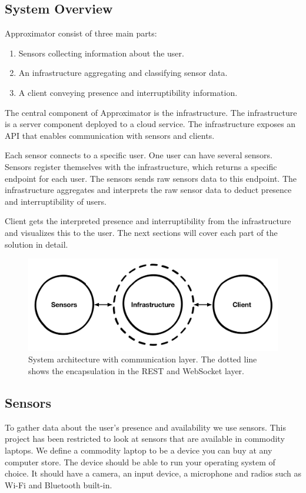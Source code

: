 \documentclass{sigchi}
\begin{document}
\subsection{System Overview}
Approximator consist of three main parts:
\begin{enumerate}[noitemsep]
  \item Sensors collecting information about the user.
  \item An infrastructure aggregating and classifying sensor data.
  \item A client conveying presence and interruptibility information.
\end{enumerate}

The central component of Approximator is the infrastructure.
The infrastructure is a server component deployed to a cloud service.
The infrastructure exposes an API that enables communication with sensors and clients.

Each sensor connects to a specific user.
One user can have several sensors.
Sensors register themselves with the infrastructure, which returns a specific endpoint for each user.
The sensors sends raw sensors data to this endpoint.
The infrastructure aggregates and interprets the raw sensor data to deduct presence and interruptibility of users.

Client gets the interpreted presence and interruptibility from the infrastructure and visualizes this to the user.
The next sections will cover each part of the solution in detail.

\begin{figure}[H]
  \centering
  \includegraphics[width=\columnwidth]{figures/system_architecture.pdf}
  \caption{System architecture with communication layer. The dotted line shows the encapsulation in the REST and WebSocket layer.}
  \label{fig:architecture}
\end{figure}

\subsection{Sensors}
To gather data about the user's presence and availability we use sensors.
This project has been restricted to look at sensors that are available in commodity laptops.
We define a commodity laptop to be a device you can buy at any computer store.
The device should be able to run your operating system of choice.
It should have a camera, an input device, a microphone and radios such as Wi-Fi and Bluetooth built-in.
\end{document}
